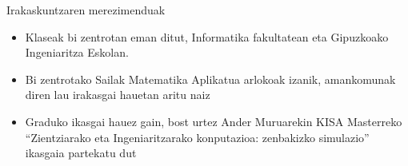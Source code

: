 \documentclass[
 10pt,%
 compress,%
 t,       %
 xcolor=svgnames
]{beamer}
\theoremstyle{definition} \newtheorem{definicion}{Definicion}[section]
\theoremstyle{propiedades} \newtheorem{propiedades}{Propiedades}[section]
\begin{document}
\begin{frame}{Irakaskuntzaren merezimenduak}
{\begin{itemize}
	\item Klaseak bi zentrotan eman ditut, Informatika fakultatean eta Gipuzkoako Ingeniaritza Eskolan.
	
	\medskip
	
	\item Bi zentrotako  Sailak Matematika Aplikatua arlokoak izanik,  
	amankomunak diren lau irakasgai hauetan aritu naiz %
	
	\medskip
	\item Graduko ikasgai hauez gain, bost urtez   Ander Muruarekin KISA Masterreko “Zientziarako eta Ingeniaritzarako konputazioa: zenbakizko simulazio” ikasgaia partekatu dut 
\end{itemize}



}

\end{frame}

\end{document}
